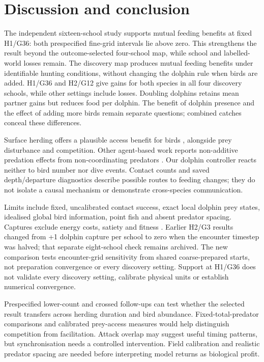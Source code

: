 \documentclass[10pt,a4paper,twocolumn]{article}
\begin{document}
\section{Discussion and conclusion}
The independent sixteen-school study supports mutual feeding benefits at fixed H1/G36: both prespecified fine-grid intervals lie above zero. This strengthens the result beyond the outcome-selected four-school map, while school and labelled-world losses remain. The discovery map produces mutual feeding benefits under identifiable hunting conditions, without changing the dolphin rule when birds are added. H1/G36 and H2/G12 give gains for both species in all four discovery schools, while other settings include losses. Doubling dolphins retains mean partner gains but reduces food per dolphin. The benefit of dolphin presence and the effect of adding more birds remain separate questions; combined catches conceal these differences.

Surface herding offers a plausible access benefit for birds \citep{odonoghue2009,thiebault2016,licht2026}, alongside prey disturbance and competition. Other agent-based work reports non-additive predation effects from non-coordinating predators \citep{mohapatra2025}. Our dolphin controller reacts neither to bird number nor dive events. Contact counts and saved depth/departure diagnostics describe possible routes to feeding changes; they do not isolate a causal mechanism or demonstrate cross-species communication.

Limits include fixed, uncalibrated contact success, exact local dolphin prey states, idealised global bird information, point fish and absent predator spacing. Captures exclude energy costs, satiety and fitness \citep{thiebault2016,licht2026,stockin2022}. Earlier H2/G3 results changed from +1 dolphin capture per school to zero when the encounter timestep was halved; that separate eight-school check remains archived. The new comparison tests encounter-grid sensitivity from shared coarse-prepared starts, not preparation convergence or every discovery setting. Support at H1/G36 does not validate every discovery setting, calibrate physical units or establish numerical convergence.

Prespecified lower-count and crossed follow-ups can test whether the selected result transfers across herding duration and bird abundance. Fixed-total-predator comparisons and calibrated prey-access measures would help distinguish competition from facilitation. Attack overlap may suggest useful timing patterns, but synchronisation needs a controlled intervention. Field calibration and realistic predator spacing are needed before interpreting model returns as biological profit.
\end{document}
